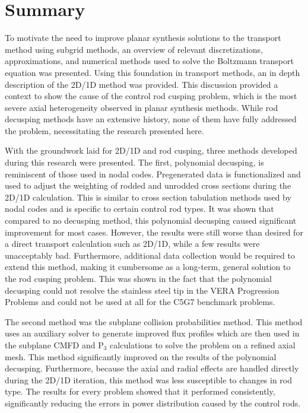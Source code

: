 \section{Summary}

To motivate the need to improve planar synthesis solutions to the transport method using subgrid methods, an overview of relevant discretizations, approximations, and numerical methods used to solve the Boltzmann transport equation was presented.  Using this foundation in transport methods, an in depth description of the 2D/1D method was provided.  This discussion provided a context to show the cause of the control rod cusping problem, which is the most severe axial heterogeneity observed in planar synthesis methods.  While rod decusping methods have an extensive history, none of them have fully addressed the problem, necessitating the research presented here.

With the groundwork laid for 2D/1D and rod cusping, three methods developed during this research were presented.  The first, polynomial decusping, is reminiscent of those used in nodal codes.  Pregenerated data is functionalized and used to adjust the weighting of rodded and unrodded cross sections during the 2D/1D calculation.  This is similar to cross section tabulation methods used by nodal codes and is specific to certain control rod types.  It was shown that compared to no decusping method, this polynomial decusping caused significant improvement for most cases.  However, the results were still worse than desired for a direct transport calculation such as 2D/1D, while a few results were unacceptably bad.  Furthermore, additional data collection would be required to extend this method, making it cumbersome as a long-term, general solution to the rod cusping problem.  This was shown in the fact that the polynomial decusping could not resolve the stainless steel tip in the VERA Progression Problems and could not be used at all for the C5G7 benchmark problems.

The second method was the subplane collision probabilities method.  This method uses an auxiliary solver to generate improved flux profiles which are then used in the subplane CMFD and P$_3$ calculations to solve the problem on a refined axial mesh.  This method significantly improved on the results of the polynomial decusping.  Furthermore, because the axial and radial effects are handled directly during the 2D/1D iteration, this method was less susceptible to changes in rod type.  The results for every problem showed that it performed consistently, significantly reducing the errors in power distribution caused by the control rods.

